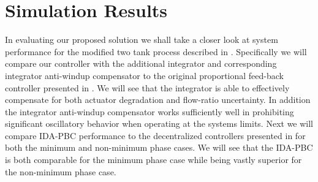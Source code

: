 \section{Simulation Results}
\label{S:simulations}
In evaluating our proposed solution we shall take a closer look at
system performance for the modified two tank process described in
\cite{johnsen07:_inter_and_dampin_assig_passiv}.   Specifically we
will compare our controller with the additional integrator and
corresponding integrator anti-windup compensator to the original
proportional feed-back controller presented in
\cite{johnsen07:_inter_and_dampin_assig_passiv}.  We will see that the
integrator is able to effectively compensate for both actuator
degradation and flow-ratio uncertainty.  In addition the integrator
anti-windup compensator works sufficiently well in prohibiting
significant oscillatory behavior when operating at the systems
limits.  Next we will compare IDA-PBC performance to the decentralized
controllers presented in \cite{johansson00:_quadr_tank_proces} for
both the minimum and non-minimum phase cases.  We will see that the
IDA-PBC is both comparable for the minimum phase case while being
vastly superior for the non-minimum phase case.
